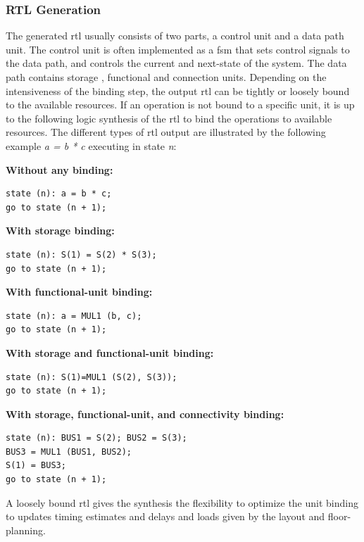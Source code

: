 \subsubsection{RTL Generation}
The generated \gls{rtl} usually consists of two parts, a control unit and a data path unit. The control unit is often implemented as a \gls{fsm} that sets control signals to the data path, and controls the current and next-state of the system. The data path contains storage , functional and connection units. Depending on the intensiveness of the binding step, the output \gls{rtl} can be tightly or loosely bound to the available resources. If an operation is not bound to a specific unit, it is up to the following logic synthesis of the \gls{rtl} to bind the operations to available resources. The different types of \gls{rtl} output are illustrated by the following example \textit{a = b * c} executing in state \textit{n}:\\
\begin{minipage}[t][300px]{\textwidth}
\textbf{Without any binding:}%
\begin{verbatim}
state (n): a = b * c;
go to state (n + 1);
\end{verbatim}
\textbf{With storage binding:}%
\begin{verbatim}
state (n): S(1) = S(2) * S(3);
go to state (n + 1);
\end{verbatim}
\textbf{With functional-unit binding:}%
\begin{verbatim}
state (n): a = MUL1 (b, c);
go to state (n + 1);
\end{verbatim}
\textbf{With storage and functional-unit binding:}%
\begin{verbatim}
state (n): S(1)=MUL1 (S(2), S(3));
go to state (n + 1);
\end{verbatim}
\textbf{With storage, functional-unit, and connectivity binding:}%
\begin{verbatim}
state (n): BUS1 = S(2); BUS2 = S(3);
BUS3 = MUL1 (BUS1, BUS2);
S(1) = BUS3;
go to state (n + 1);
\end{verbatim}
\end{minipage}
A loosely bound \gls{rtl} gives the synthesis the flexibility to optimize the unit binding to updates timing estimates and delays and loads given by the layout and floor-planning.

